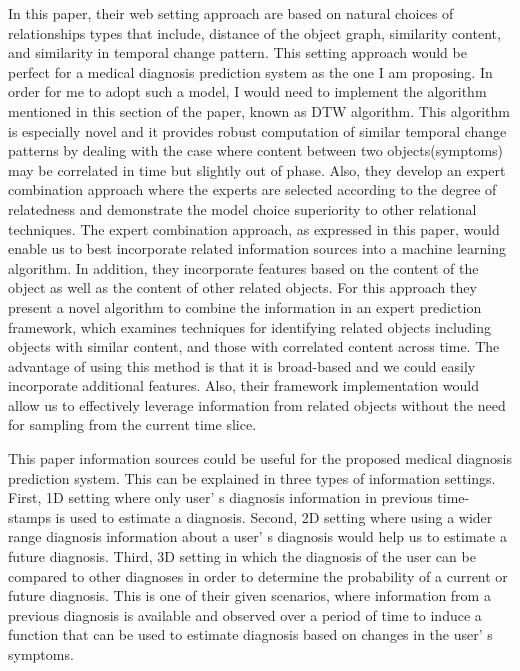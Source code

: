 \documentclass{sig-alternate}
\begin{document}
In this paper, their web setting approach are based on natural choices of relationships types that include, distance of the object graph, similarity content, and similarity in temporal change pattern. This setting approach would be perfect for a medical diagnosis prediction system as the one I am proposing. In order for me to adopt such a model, I would need to implement the algorithm mentioned in this section of the paper, known as DTW algorithm. This algorithm is especially novel and it provides robust computation of similar temporal change patterns by dealing with the case where content between two objects(symptoms) may be correlated in time but slightly out of phase. Also, they develop an expert combination approach where the experts are selected according to the degree of relatedness and demonstrate the model choice superiority to other relational techniques. The expert combination approach, as expressed in this paper, would enable us to best incorporate related information sources into a machine learning algorithm. In addition, they incorporate features based on the content of the object as well as the content of other related objects. For this approach they present a novel algorithm to combine the information in an expert prediction framework, which examines techniques for identifying related objects including objects with similar content, and those with correlated content across time. The advantage of using this method is that it is broad-based and we could easily incorporate additional features. Also, their framework implementation would allow us to effectively  leverage information from related objects without the need for sampling from the current time slice.\newline

This paper information sources could be useful for the proposed medical diagnosis prediction system. This can be explained in three types of information settings. First, 1D setting where only user' s diagnosis information in previous time-stamps is used to estimate a diagnosis. Second, 2D setting where using a wider range diagnosis information about a user' s diagnosis would help us to estimate a future diagnosis. Third, 3D setting in which the diagnosis of the user can be compared to other diagnoses in order to determine the probability of a current or future diagnosis. This is one of their given scenarios, where information from a previous diagnosis is available and observed over a period of time to induce a function that can be used to estimate diagnosis based on changes in the user' s symptoms.\newline
\end{document}
